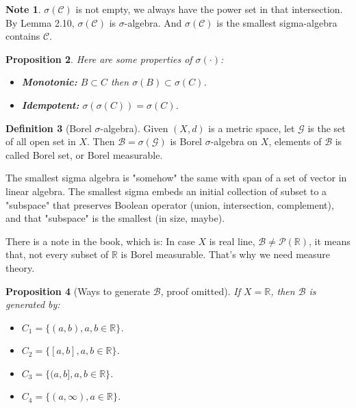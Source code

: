 \documentclass[11pt,a4paper]{article}
\theoremstyle{definition}
\newtheorem{definition}{Definition}[section]
\newtheorem{note}[definition]{Note}
\theoremstyle{plain}
\newtheorem{proposition}[definition]{Proposition}
\newcommand{\R}{\mathbb{R}}
\begin{document}
\begin{note}
$\sigma(\mathcal{C})$ is not empty, we always have the power set in that intersection. By Lemma 2.10, $\sigma(\mathcal{C})$ is $\sigma$-algebra. And $\sigma(\mathcal{C})$ is the smallest sigma-algebra contains $\mathcal{C}$.
\end{note}

\begin{proposition}
Here are some properties of $\sigma(\cdot)$:
\begin{itemize}
    \item \textbf{Monotonic:} $B\subset C$ then $\sigma(B) \subset \sigma(C)$.
    \item \textbf{Idempotent:} $\sigma(\sigma(C)) = \sigma(C)$.
\end{itemize}
\end{proposition}

\begin{definition}[Borel $\sigma$-algebra]
Given $(X, d)$ is a metric space, let $\mathcal{G}$ is the set of all open set in $X$. Then $\mathcal{B} = \sigma(\mathcal{G})$ is Borel $\sigma$-algebra on $X$, elements of $\mathcal{B}$ is called Borel set, or Borel measurable.
\end{definition}

\begin{mynote}
The smallest sigma algebra is "somehow" the same with span of a set of vector in linear algebra. The smallest sigma embeds an initial collection of subset to a "subspace" that preserves Boolean operator (union, intersection, complement), and that "subspace" is the smallest (in size, maybe).

There is a note in the book, which is: In case $X$ is real line, $\mathcal{B} \neq \mathcal{P}(\R)$, it means that, not every subset of $\R$ is Borel measurable. That's why we need measure theory.
\end{mynote}

\begin{proposition}[Ways to generate $\mathcal{B}$, proof omitted]
If $X = \R$, then $\mathcal{B}$ is generated by:
\begin{itemize}
    \item $C_1 =\{(a,b), a,b\in \R\}$.
    \item $C_2 =\{[a,b], a,b\in \R\}$.
    \item $C_3 =\{(a,b], a,b\in \R\}$.
    \item $C_4 =\{(a,\infty), a\in \R\}$.
\end{itemize}
\end{proposition}
\end{document}
